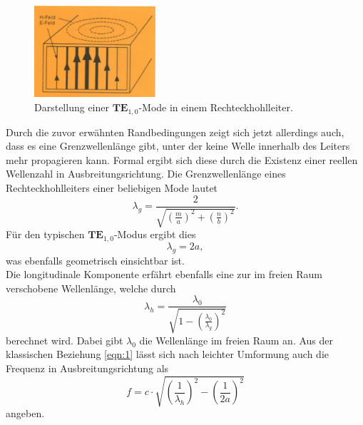\begin{figure}
    \centering
    \includegraphics[width=0.4\textwidth]{bilder/mode.png}
    \caption{Darstellung einer $\textbf{TE}_{1,0}$-Mode in einem Rechteckhohlleiter. \cite{skript}} 
    \label{fig:4}
\end{figure}
Durch die zuvor erwähnten Randbedingungen zeigt sich jetzt allerdings auch, dass es eine Grenzwellenlänge gibt, unter der keine Welle innerhalb des Leiters mehr propagieren kann. Formal ergibt sich diese durch die Existenz einer reellen Wellenzahl 
in Ausbreitungsrichtung. 
Die Grenzwellenlänge eines Rechteckhohlleiters einer beliebigen Mode lautet
\begin{equation}
\lambda_{g} = \frac{2}{\sqrt{\left(\frac{m}{a}\right)^2 + \left(\frac{n}{b}\right)^2}}.
\end{equation}
Für den typischen $\textbf{TE}_{1,0}$-Modus ergibt dies 
\begin{equation}
    \lambda_{g} = 2a,
\end{equation}
was ebenfalls geometrisch einsichtbar ist.
\\
Die longitudinale Komponente erfährt ebenfalls eine zur im freien Raum verschobene Wellenlänge, welche durch
\begin{equation}
    \lambda_{h} = \frac{\lambda_0}{\sqrt{1 - \left(\frac{\lambda_0}{\lambda_{g}}\right)^2}}
\end{equation}
berechnet wird. Dabei gibt $\lambda_0$ die Wellenlänge im freien Raum an. Aus der klassischen Beziehung \ref{eqn:1} lässt sich nach leichter Umformung auch die Frequenz in Ausbreitungsrichtung als
\begin{equation}
    \label{eqn:222}
    f = c \cdot \sqrt{\left(\frac{1}{\lambda_h}\right)^2 - \left(\frac{1}{2a}\right)^2}
\end{equation}
angeben.


